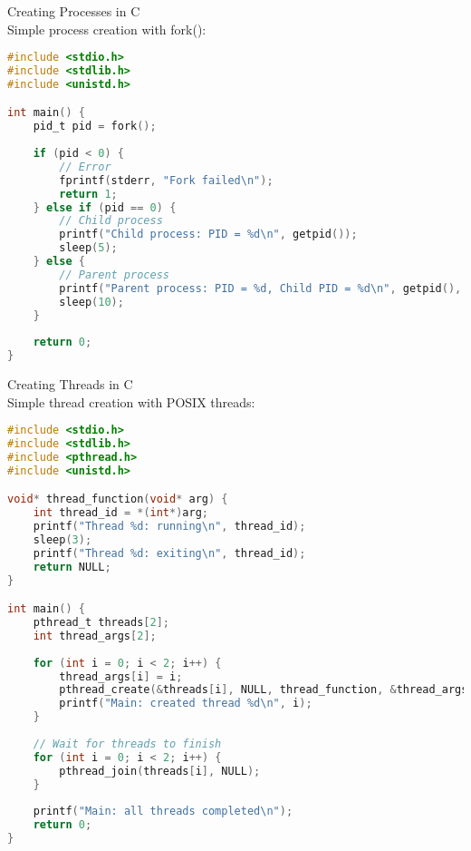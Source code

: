 \begin{example2}{Creating Processes in C}\\
    Simple process creation with fork():
    
\begin{lstlisting}[language=C, style=basesmol]
#include <stdio.h>
#include <stdlib.h>
#include <unistd.h>

int main() {
    pid_t pid = fork();
    
    if (pid < 0) {
        // Error
        fprintf(stderr, "Fork failed\n");
        return 1;
    } else if (pid == 0) {
        // Child process
        printf("Child process: PID = %d\n", getpid());
        sleep(5);
    } else {
        // Parent process
        printf("Parent process: PID = %d, Child PID = %d\n", getpid(), pid);
        sleep(10);
    }
    
    return 0;
}
\end{lstlisting}
\end{example2}

\begin{example2}{Creating Threads in C}\\
    Simple thread creation with POSIX threads:
    
\begin{lstlisting}[language=C, style=basesmol]
#include <stdio.h>
#include <stdlib.h>
#include <pthread.h>
#include <unistd.h>

void* thread_function(void* arg) {
    int thread_id = *(int*)arg;
    printf("Thread %d: running\n", thread_id);
    sleep(3);
    printf("Thread %d: exiting\n", thread_id);
    return NULL;
}

int main() {
    pthread_t threads[2];
    int thread_args[2];
    
    for (int i = 0; i < 2; i++) {
        thread_args[i] = i;
        pthread_create(&threads[i], NULL, thread_function, &thread_args[i]);
        printf("Main: created thread %d\n", i);
    }
    
    // Wait for threads to finish
    for (int i = 0; i < 2; i++) {
        pthread_join(threads[i], NULL);
    }
    
    printf("Main: all threads completed\n");
    return 0;
}
\end{lstlisting}
\end{example2}